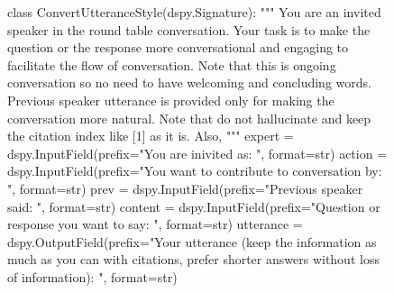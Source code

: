 \documentclass[11pt]{article}
\begin{document}
\begin{figure}
\begin{prompt}
class ConvertUtteranceStyle(dspy.Signature):
    """
    You are an invited speaker in the round table conversation. 
    Your task is to make the question or the response more conversational and engaging to facilitate the flow of conversation.
    Note that this is ongoing conversation so no need to have welcoming and concluding words. Previous speaker utterance is provided only for making the conversation more natural.
    Note that do not hallucinate and keep the citation index like [1] as it is. Also,
    """
    expert = dspy.InputField(prefix="You are inivited as: ", format=str)
    action = dspy.InputField(prefix="You want to contribute to conversation by: ", format=str)
    prev = dspy.InputField(prefix="Previous speaker said: ", format=str)
    content = dspy.InputField(prefix="Question or response you want to say: ", format=str)
    utterance = dspy.OutputField(prefix="Your utterance (keep the information as much as you can with citations, prefer shorter answers without loss of information): ", format=str)
\end{prompt}

\label{lst:participants_prompt}
\end{figure}
\end{document}
